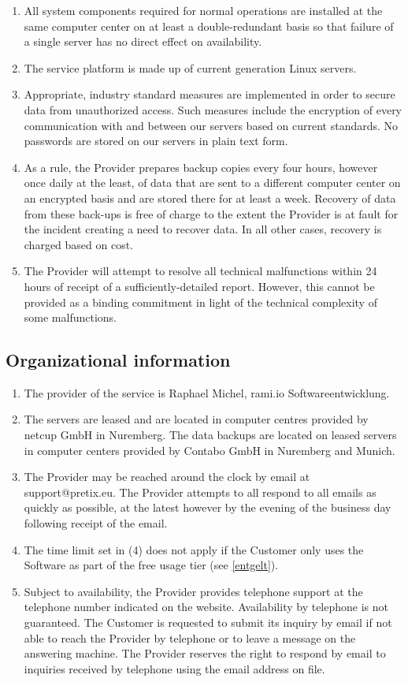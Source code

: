\documentclass{terms}
\begin{document}
\begin{enumerate}
\item All system components required for normal operations are installed at the same computer center on at least a double-redundant basis so that failure of a single server has no direct effect on availability.
\item The service platform is made up of current generation Linux servers.
\item Appropriate, industry standard measures are implemented in order to secure data from unauthorized access. Such measures include the encryption of every communication with and between our servers based on current standards. No passwords are stored on our servers in plain text form.
\item As a rule, the Provider prepares backup copies every four hours, however once daily at the least, of data that are sent to a different computer center on an encrypted basis and are stored there for at least a week. Recovery of data from these back-ups is free of charge to the extent the Provider is at fault for the incident creating a need to recover data. In all other cases, recovery is charged based on cost.
\item The Provider will attempt to resolve all technical malfunctions within 24 hours of receipt of a sufficiently-detailed report. However, this cannot be provided as a binding commitment in light of the technical complexity of some malfunctions.
\end{enumerate}
\subsection{Organizational information}
\begin{enumerate}
\item The provider of the service is Raphael Michel, rami.io Softwareentwicklung.
\item The servers are leased and are located in computer centres provided by netcup GmbH in Nuremberg. The data backups are located on leased servers in computer centers provided by Contabo GmbH in Nuremberg and Munich.
\item The Provider may be reached around the clock by email at support@pretix.eu. The Provider attempts to all respond to all emails as quickly as possible, at the latest however by the evening of the business day following receipt of the email.
\item The time limit set in (4) does not apply if the Customer only uses the Software as part of the free usage tier (see \ref{entgelt}).
\item Subject to availability, the Provider provides telephone support at the telephone number indicated on the website. Availability by telephone is not guaranteed. The Customer is requested to submit its inquiry by email if not able to reach the Provider by telephone or to leave a message on the answering machine. The Provider reserves the right to respond by email to inquiries received by telephone using the email address on file.
\end{enumerate}
\end{document}
